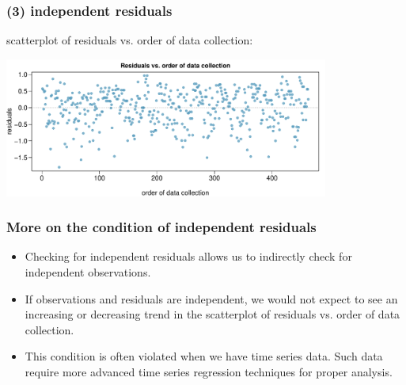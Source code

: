 
\begin{frame}[fragile]
\frametitle{(3) independent residuals}

scatterplot of residuals vs. order of data collection: \\

\begin{center}
\includegraphics[width=0.8\textwidth]{9-3_model_cond/figures/beauty/indep_res}
\end{center}


\end{frame}


\begin{frame}
\frametitle{More on the condition of independent residuals}

\begin{itemize}

\item Checking for independent residuals allows us to indirectly check for independent observations.

\item If observations and residuals are independent, we would not expect to see an increasing or decreasing trend in the scatterplot of residuals vs. order of data collection.

\item This condition is often violated when we have time series data. Such data require more advanced time series regression techniques for proper analysis.

\end{itemize}

\end{frame}


